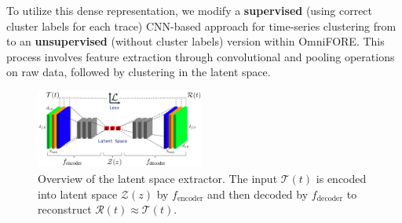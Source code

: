 \documentclass{ieeetmlcn}
\begin{document}
To utilize this dense representation, we modify a \textbf{supervised} (using correct cluster labels for each trace) CNN-based approach for time-series clustering from \cite{clusteringDL} to an \textbf{unsupervised} (without cluster labels) version within OmniFORE. This process involves feature extraction through convolutional and pooling operations on raw data, followed by clustering in the latent space.


\begin{figure}\centering
\centering
\includegraphics[width=0.49\textwidth]{img/latent_space_creation.png}
\caption{Overview of the latent space extractor. The input $\mathcal{T}(t)$ is encoded into latent space $\mathcal{Z}(z)$ by $f_{\text{encoder}}$ and then decoded by $f_{\text{decoder}}$ to reconstruct $\mathcal{R}(t) \approx \mathcal{T}(t)$.}
\label{fig:latent_space_creation}
\end{figure}
\end{document}
